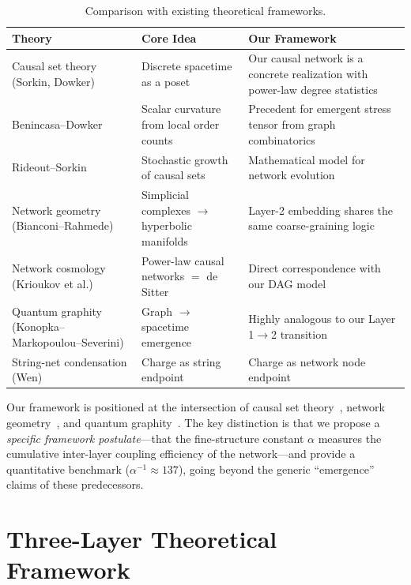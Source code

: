 \documentclass[11pt,a4paper]{article}
\theoremstyle{definition}
\theoremstyle{remark}
\begin{document}
\begin{table}[htbp]
\centering
\caption{Comparison with existing theoretical frameworks.}
\label{tab:comparison}
\begin{tabular}{@{}p{4.2cm}p{4.5cm}p{5.5cm}@{}}
\toprule
\textbf{Theory} & \textbf{Core Idea} & \textbf{Our Framework} \\
\midrule
Causal set theory (Sorkin, Dowker) & Discrete spacetime as a poset & Our causal network is a concrete realization with power-law degree statistics \\
Benincasa--Dowker & Scalar curvature from local order counts & Precedent for emergent stress tensor from graph combinatorics \\
Rideout--Sorkin & Stochastic growth of causal sets & Mathematical model for network evolution \\
Network geometry (Bianconi--Rahmede) & Simplicial complexes $\to$ hyperbolic manifolds & Layer-2 embedding shares the same coarse-graining logic \\
Network cosmology (Krioukov et al.) & Power-law causal networks $=$ de Sitter & Direct correspondence with our DAG model \\
Quantum graphity (Konopka--Markopoulou--Severini) & Graph $\to$ spacetime emergence & Highly analogous to our Layer 1$\to$2 transition \\
String-net condensation (Wen) & Charge as string endpoint & Charge as network node endpoint \\
\bottomrule
\end{tabular}
\end{table}

Our framework is positioned at the intersection of causal set
theory~\cite{Sorkin2005,Surya2019,Benincasa2010,Rideout1999}, network
geometry~\cite{Bianconi2016,Krioukov2012}, and quantum
graphity~\cite{Konopka2008}. The key distinction is that we propose a
\emph{specific framework postulate}---that the fine-structure constant $\alpha$
measures the cumulative inter-layer coupling efficiency of the network---and
provide a quantitative benchmark ($\alpha^{-1}\approx 137$), going beyond the
generic ``emergence'' claims of these predecessors.

\section{Three-Layer Theoretical Framework}\label{sec:framework}
\end{document}
